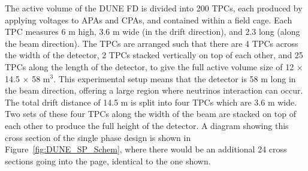 The active volume of the DUNE FD is divided into 200 TPCs, each produced by applying voltages to APAs and CPAs, and contained within a field cage. Each TPC measures 6 m high, 3.6 m wide (in the drift direction), and 2.3 long (along the beam direction). The TPCs are arranged such that there are 4 TPCs across the width of the detector, 2 TPCs stacked vertically on top of each other, and 25 TPCs along the length of the detector, to give the full active volume size of 12 $\times$ 14.5 $\times$ 58 m$^3$. This experimental setup means that the detector is 58 m long in the beam direction, offering a large region where neutrinos interaction can occur. The total drift distance of 14.5 m is split into four TPCs which are 3.6 m wide. Two sets of these four TPCs along the width of the beam are stacked on top of each other to produce the full height of the detector. A diagram showing this cross section of the single phase design is shown in Figure~\ref{fig:DUNE_SP_Schem}, where there would be an additional 24 cross sections going into the page, identical to the one shown. \\

